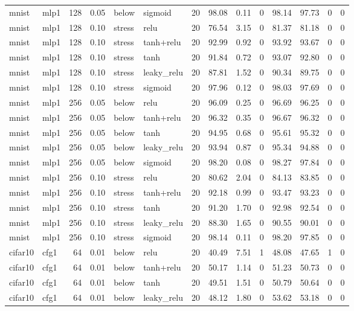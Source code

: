 \begin{table}[htbp]
{\begin{tabular}{@{}llrrllrrrrrrrr@{}}
mnist & mlp1 & 128 & 0.05 & below & sigmoid & 20 & 98.08 & 0.11 & 0 & 98.14 & 97.73 & 0 & 0 \\
mnist & mlp1 & 128 & 0.10 & stress & relu & 20 & 76.54 & 3.15 & 0 & 81.37 & 81.18 & 0 & 0 \\
mnist & mlp1 & 128 & 0.10 & stress & tanh+relu & 20 & 92.99 & 0.92 & 0 & 93.92 & 93.67 & 0 & 0 \\
mnist & mlp1 & 128 & 0.10 & stress & tanh & 20 & 91.84 & 0.72 & 0 & 93.07 & 92.80 & 0 & 0 \\
mnist & mlp1 & 128 & 0.10 & stress & leaky\_relu & 20 & 87.81 & 1.52 & 0 & 90.34 & 89.75 & 0 & 0 \\
mnist & mlp1 & 128 & 0.10 & stress & sigmoid & 20 & 97.96 & 0.12 & 0 & 98.03 & 97.69 & 0 & 0 \\
mnist & mlp1 & 256 & 0.05 & below & relu & 20 & 96.09 & 0.25 & 0 & 96.69 & 96.25 & 0 & 0 \\
mnist & mlp1 & 256 & 0.05 & below & tanh+relu & 20 & 96.32 & 0.35 & 0 & 96.67 & 96.32 & 0 & 0 \\
mnist & mlp1 & 256 & 0.05 & below & tanh & 20 & 94.95 & 0.68 & 0 & 95.61 & 95.32 & 0 & 0 \\
mnist & mlp1 & 256 & 0.05 & below & leaky\_relu & 20 & 93.94 & 0.87 & 0 & 95.34 & 94.88 & 0 & 0 \\
mnist & mlp1 & 256 & 0.05 & below & sigmoid & 20 & 98.20 & 0.08 & 0 & 98.27 & 97.84 & 0 & 0 \\
mnist & mlp1 & 256 & 0.10 & stress & relu & 20 & 80.62 & 2.04 & 0 & 84.13 & 83.85 & 0 & 0 \\
mnist & mlp1 & 256 & 0.10 & stress & tanh+relu & 20 & 92.18 & 0.99 & 0 & 93.47 & 93.23 & 0 & 0 \\
mnist & mlp1 & 256 & 0.10 & stress & tanh & 20 & 91.20 & 1.70 & 0 & 92.98 & 92.54 & 0 & 0 \\
mnist & mlp1 & 256 & 0.10 & stress & leaky\_relu & 20 & 88.30 & 1.65 & 0 & 90.55 & 90.01 & 0 & 0 \\
mnist & mlp1 & 256 & 0.10 & stress & sigmoid & 20 & 98.14 & 0.11 & 0 & 98.20 & 97.85 & 0 & 0 \\
cifar10 & cfg1 & 64 & 0.01 & below & relu & 20 & 40.49 & 7.51 & 1 & 48.08 & 47.65 & 1 & 0 \\
cifar10 & cfg1 & 64 & 0.01 & below & tanh+relu & 20 & 50.17 & 1.14 & 0 & 51.23 & 50.73 & 0 & 0 \\
cifar10 & cfg1 & 64 & 0.01 & below & tanh & 20 & 49.51 & 1.51 & 0 & 50.79 & 50.64 & 0 & 0 \\
cifar10 & cfg1 & 64 & 0.01 & below & leaky\_relu & 20 & 48.12 & 1.80 & 0 & 53.62 & 53.18 & 0 & 0 \\

\end{tabular}}
\end{table}
